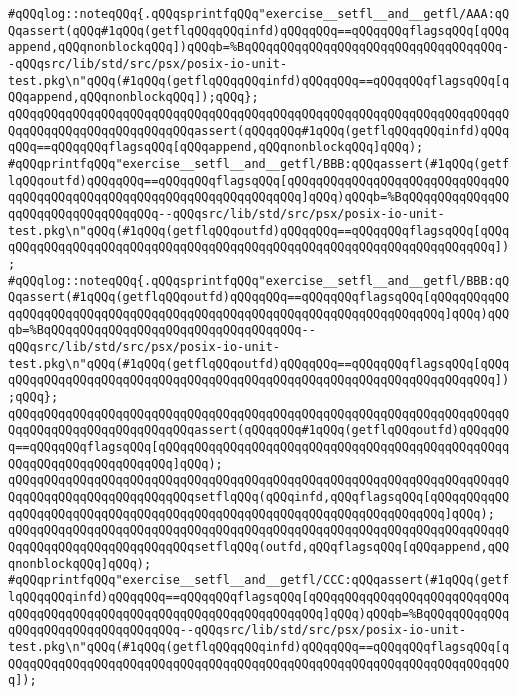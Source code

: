 \verb|#qQQqlog::noteqQQq{.qQQqsprintfqQQq"exercise__setfl__and__getfl/AAA:qQQqassert(qQQq#1qQQq(getflqQQqqQQqinfd)qQQqqQQq==qQQqqQQqflagsqQQq[qQQqappend,qQQqnonblockqQQq])qQQqb=%BqQQqqQQqqQQqqQQqqQQqqQQqqQQqqQQqqQQq--qQQqsrc/lib/std/src/psx/posix-io-unit-test.pkg\n"qQQq(#1qQQq(getflqQQqqQQqinfd)qQQqqQQq==qQQqqQQqflagsqQQq[qQQqappend,qQQqnonblockqQQq]);qQQq};|\newline
\verb|qQQqqQQqqQQqqQQqqQQqqQQqqQQqqQQqqQQqqQQqqQQqqQQqqQQqqQQqqQQqqQQqqQQqqQQqqQQqqQQqqQQqqQQqqQQqqQQqassert(qQQqqQQq#1qQQq(getflqQQqqQQqinfd)qQQqqQQq==qQQqqQQqflagsqQQq[qQQqappend,qQQqnonblockqQQq]qQQq);|\newline
\verb|#qQQqprintfqQQq"exercise__setfl__and__getfl/BBB:qQQqassert(#1qQQq(getflqQQqoutfd)qQQqqQQq==qQQqqQQqflagsqQQq[qQQqqQQqqQQqqQQqqQQqqQQqqQQqqQQqqQQqqQQqqQQqqQQqqQQqqQQqqQQqqQQqqQQqqQQq]qQQq)qQQqb=%BqQQqqQQqqQQqqQQqqQQqqQQqqQQqqQQqqQQq--qQQqsrc/lib/std/src/psx/posix-io-unit-test.pkg\n"qQQq(#1qQQq(getflqQQqoutfd)qQQqqQQq==qQQqqQQqflagsqQQq[qQQqqQQqqQQqqQQqqQQqqQQqqQQqqQQqqQQqqQQqqQQqqQQqqQQqqQQqqQQqqQQqqQQqqQQq]);|\newline
\verb|#qQQqlog::noteqQQq{.qQQqsprintfqQQq"exercise__setfl__and__getfl/BBB:qQQqassert(#1qQQq(getflqQQqoutfd)qQQqqQQq==qQQqqQQqflagsqQQq[qQQqqQQqqQQqqQQqqQQqqQQqqQQqqQQqqQQqqQQqqQQqqQQqqQQqqQQqqQQqqQQqqQQqqQQq]qQQq)qQQqb=%BqQQqqQQqqQQqqQQqqQQqqQQqqQQqqQQqqQQq--qQQqsrc/lib/std/src/psx/posix-io-unit-test.pkg\n"qQQq(#1qQQq(getflqQQqoutfd)qQQqqQQq==qQQqqQQqflagsqQQq[qQQqqQQqqQQqqQQqqQQqqQQqqQQqqQQqqQQqqQQqqQQqqQQqqQQqqQQqqQQqqQQqqQQqqQQq]);qQQq};|\newline
\verb|qQQqqQQqqQQqqQQqqQQqqQQqqQQqqQQqqQQqqQQqqQQqqQQqqQQqqQQqqQQqqQQqqQQqqQQqqQQqqQQqqQQqqQQqqQQqqQQqassert(qQQqqQQq#1qQQq(getflqQQqoutfd)qQQqqQQq==qQQqqQQqflagsqQQq[qQQqqQQqqQQqqQQqqQQqqQQqqQQqqQQqqQQqqQQqqQQqqQQqqQQqqQQqqQQqqQQqqQQqqQQq]qQQq);|\newline
\newline
\newline
\verb|qQQqqQQqqQQqqQQqqQQqqQQqqQQqqQQqqQQqqQQqqQQqqQQqqQQqqQQqqQQqqQQqqQQqqQQqqQQqqQQqqQQqqQQqqQQqqQQqsetflqQQq(qQQqinfd,qQQqflagsqQQq[qQQqqQQqqQQqqQQqqQQqqQQqqQQqqQQqqQQqqQQqqQQqqQQqqQQqqQQqqQQqqQQqqQQqqQQq]qQQq);|\newline
\verb|qQQqqQQqqQQqqQQqqQQqqQQqqQQqqQQqqQQqqQQqqQQqqQQqqQQqqQQqqQQqqQQqqQQqqQQqqQQqqQQqqQQqqQQqqQQqqQQqsetflqQQq(outfd,qQQqflagsqQQq[qQQqappend,qQQqnonblockqQQq]qQQq);|\newline
\newline
\verb|#qQQqprintfqQQq"exercise__setfl__and__getfl/CCC:qQQqassert(#1qQQq(getflqQQqqQQqinfd)qQQqqQQq==qQQqqQQqflagsqQQq[qQQqqQQqqQQqqQQqqQQqqQQqqQQqqQQqqQQqqQQqqQQqqQQqqQQqqQQqqQQqqQQqqQQqqQQq]qQQq)qQQqb=%BqQQqqQQqqQQqqQQqqQQqqQQqqQQqqQQqqQQq--qQQqsrc/lib/std/src/psx/posix-io-unit-test.pkg\n"qQQq(#1qQQq(getflqQQqqQQqinfd)qQQqqQQq==qQQqqQQqflagsqQQq[qQQqqQQqqQQqqQQqqQQqqQQqqQQqqQQqqQQqqQQqqQQqqQQqqQQqqQQqqQQqqQQqqQQqqQQq]);|\newline
